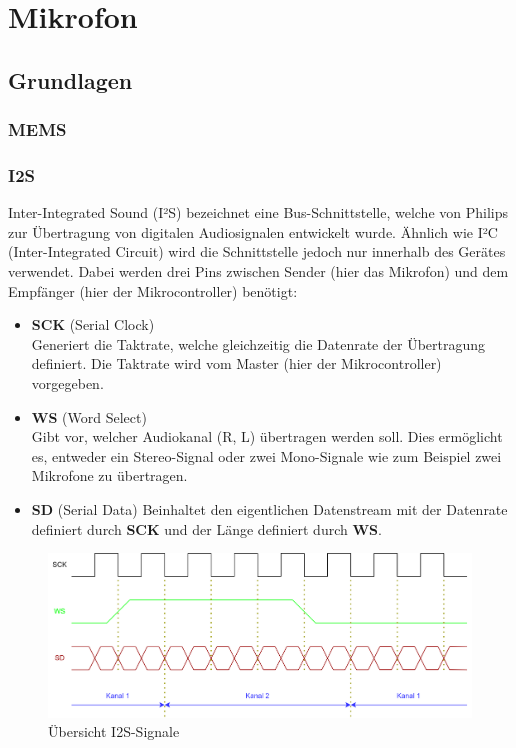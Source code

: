 \documentclass[12pt]{article}
\begin{document}
	\newpage
	\section{Mikrofon}
	\subsection{Grundlagen}
	\subsubsection{MEMS}
	
	\subsubsection{I2S}
	Inter-Integrated Sound (I²S) bezeichnet eine Bus-Schnittstelle, welche von Philips zur Übertragung von digitalen Audiosignalen entwickelt wurde. Ähnlich wie I²C (Inter-Integrated Circuit) wird die Schnittstelle jedoch nur innerhalb des Gerätes verwendet. Dabei werden drei Pins zwischen Sender (hier das Mikrofon) und dem Empfänger (hier der Mikrocontroller) benötigt:
	\begin{itemize}
		\item \textbf{SCK} \quad (Serial Clock) \\
		Generiert die Taktrate, welche gleichzeitig die Datenrate der Übertragung definiert. Die Taktrate wird vom Master (hier der Mikrocontroller) vorgegeben.
		\item \color{green}\textbf{WS}\color{black} \quad (Word Select) \\
		Gibt vor, welcher Audiokanal (R, L) übertragen werden soll. Dies ermöglicht es, entweder ein Stereo-Signal oder zwei Mono-Signale wie zum Beispiel zwei Mikrofone zu übertragen.
		\item \color{red}\textbf{SD}\color{black} \quad (Serial Data)
		Beinhaltet den eigentlichen Datenstream mit der Datenrate definiert durch \textbf{SCK} und der Länge definiert durch \color{green}\textbf{WS}\color{black}.
	\end{itemize}
	\begin{figure}[H]
		\centering
		\includegraphics[width=1\linewidth]{images/BAT_I2S}
		\caption[]{Übersicht I2S-Signale}
		\label{fig:bati2s}
	\end{figure}
\end{document}
